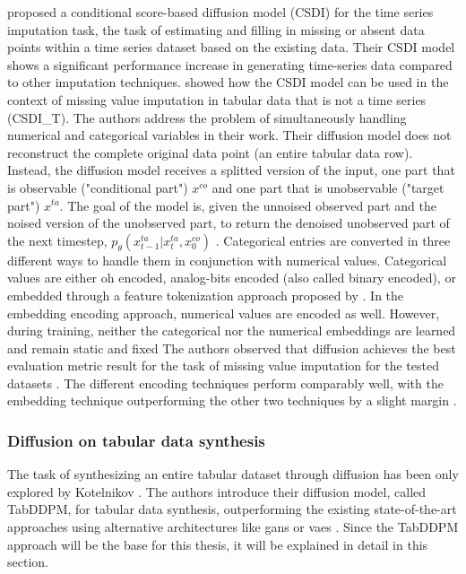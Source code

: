 \textcite{tashiro2021CSDIConditionalScorebased} proposed a conditional score-based diffusion model (CSDI) for the time series imputation task, \ie the task of estimating and filling in missing or absent data points within a time series dataset based on the existing data.
Their CSDI model shows a significant performance increase in generating time-series data compared to other imputation techniques.
\cite{zheng2022DiffusionModelsMissing} showed how the CSDI model can be used in the context of missing value imputation in tabular data that is not a time series (CSDI\_T).
The authors address the problem of simultaneously handling numerical and categorical variables in their work.
Their diffusion model does not reconstruct the complete original data point (\eg an entire tabular data row). 
Instead, the diffusion model receives a splitted version of the input, one part that is observable ("conditional part") $x^{co}$ and one part that is unobservable ("target part") $x^{ta}$.
The goal of the model is, given the unnoised observed part and the noised version of the unobserved part, to return the denoised unobserved part of the next timestep, 
\ie $p_\theta(x^{ta}_{t-1}|x^{ta}_{t},x^{co}_{0})$ \cite{zheng2022DiffusionModelsMissing}.
Categorical entries are converted in three different ways to handle them in conjunction with numerical values.
Categorical values are either \gls{oh} encoded, analog-bits encoded (also called binary encoded), or embedded through a feature tokenization approach proposed by \cite{gorishniy2021RevisitingDeepLearning}.
In the embedding encoding approach, numerical values are encoded as well. 
However, during training, neither the categorical nor the numerical embeddings are learned and remain static and fixed \cite{zheng2023DiffusionModelsMissing}
The authors observed that diffusion achieves the best evaluation metric result for the task of missing value imputation for the tested datasets \cite{zheng2022DiffusionModelsMissing}.
The different encoding techniques perform comparably well, with the embedding technique outperforming the other two techniques by a slight margin \cite{zheng2022DiffusionModelsMissing}.


\subsubsection{Diffusion on tabular data synthesis}
\label{ch:relatedWork-diffusionModels-tabDDPM}

The task of synthesizing an entire tabular dataset through diffusion has been only explored by Kotelnikov \etal \cite{kotelnikov2022TabDDPMModellingTabular}.
The authors introduce their diffusion model, called TabDDPM, for tabular data synthesis, outperforming the existing state-of-the-art approaches using alternative architectures like \glspl{gan} or \glspl{vae} \cite{kotelnikov2022TabDDPMModellingTabular}. 
Since the TabDDPM approach will be the base for this thesis, it will be explained in detail in this section.

